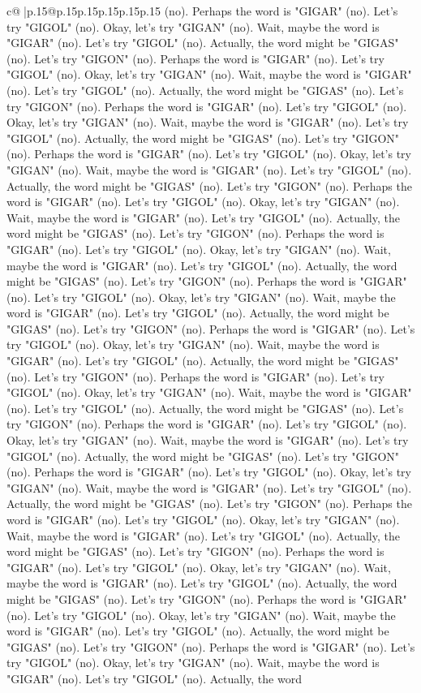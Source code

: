 \documentclass{article}
\begin{document}
{\begin{supertabular}{c@{$\;$}|p{.15\linewidth}@{}p{.15\linewidth}p{.15\linewidth}p{.15\linewidth}p{.15\linewidth}p{.15\linewidth}}
{{{(no). Perhaps the word is "GIGAR" (no). Let's try "GIGOL" (no). Okay, let's try "GIGAN" (no). Wait, maybe the word is "GIGAR" (no). Let's try "GIGOL" (no). Actually, the word might be "GIGAS" (no). Let's try "GIGON" (no). Perhaps the word is "GIGAR" (no). Let's try "GIGOL" (no). Okay, let's try "GIGAN" (no). Wait, maybe the word is "GIGAR" (no). Let's try "GIGOL" (no). Actually, the word might be "GIGAS" (no). Let's try "GIGON" (no). Perhaps the word is "GIGAR" (no). Let's try "GIGOL" (no). Okay, let's try "GIGAN" (no). Wait, maybe the word is "GIGAR" (no). Let's try "GIGOL" (no). Actually, the word might be "GIGAS" (no). Let's try "GIGON" (no). Perhaps the word is "GIGAR" (no). Let's try "GIGOL" (no). Okay, let's try "GIGAN" (no). Wait, maybe the word is "GIGAR" (no). Let's try "GIGOL" (no). Actually, the word might be "GIGAS" (no). Let's try "GIGON" (no). Perhaps the word is "GIGAR" (no). Let's try "GIGOL" (no). Okay, let's try "GIGAN" (no). Wait, maybe the word is "GIGAR" (no). Let's try "GIGOL" (no). Actually, the word might be "GIGAS" (no). Let's try "GIGON" (no). Perhaps the word is "GIGAR" (no). Let's try "GIGOL" (no). Okay, let's try "GIGAN" (no). Wait, maybe the word is "GIGAR" (no). Let's try "GIGOL" (no). Actually, the word might be "GIGAS" (no). Let's try "GIGON" (no). Perhaps the word is "GIGAR" (no). Let's try "GIGOL" (no). Okay, let's try "GIGAN" (no). Wait, maybe the word is "GIGAR" (no). Let's try "GIGOL" (no). Actually, the word might be "GIGAS" (no). Let's try "GIGON" (no). Perhaps the word is "GIGAR" (no). Let's try "GIGOL" (no). Okay, let's try "GIGAN" (no). Wait, maybe the word is "GIGAR" (no). Let's try "GIGOL" (no). Actually, the word might be "GIGAS" (no). Let's try "GIGON" (no). Perhaps the word is "GIGAR" (no). Let's try "GIGOL" (no). Okay, let's try "GIGAN" (no). Wait, maybe the word is "GIGAR" (no). Let's try "GIGOL" (no). Actually, the word might be "GIGAS" (no). Let's try "GIGON" (no). Perhaps the word is "GIGAR" (no). Let's try "GIGOL" (no). Okay, let's try "GIGAN" (no). Wait, maybe the word is "GIGAR" (no). Let's try "GIGOL" (no). Actually, the word might be "GIGAS" (no). Let's try "GIGON" (no). Perhaps the word is "GIGAR" (no). Let's try "GIGOL" (no). Okay, let's try "GIGAN" (no). Wait, maybe the word is "GIGAR" (no). Let's try "GIGOL" (no). Actually, the word might be "GIGAS" (no). Let's try "GIGON" (no). Perhaps the word is "GIGAR" (no). Let's try "GIGOL" (no). Okay, let's try "GIGAN" (no). Wait, maybe the word is "GIGAR" (no). Let's try "GIGOL" (no). Actually, the word might be "GIGAS" (no). Let's try "GIGON" (no). Perhaps the word is "GIGAR" (no). Let's try "GIGOL" (no). Okay, let's try "GIGAN" (no). Wait, maybe the word is "GIGAR" (no). Let's try "GIGOL" (no). Actually, the word might be "GIGAS" (no). Let's try "GIGON" (no). Perhaps the word is "GIGAR" (no). Let's try "GIGOL" (no). Okay, let's try "GIGAN" (no). Wait, maybe the word is "GIGAR" (no). Let's try "GIGOL" (no). Actually, the word might be "GIGAS" (no). Let's try "GIGON" (no). Perhaps the word is "GIGAR" (no). Let's try "GIGOL" (no). Okay, let's try "GIGAN" (no). Wait, maybe the word is "GIGAR" (no). Let's try "GIGOL" (no). Actually, the word }}}
\end{supertabular}}
\end{document}
